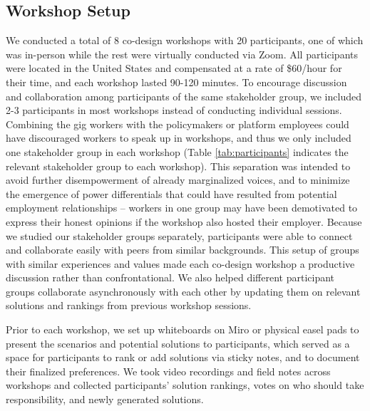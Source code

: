 \subsection{Workshop Setup}
We conducted a total of 8 co-design workshops with 20 participants, one of which was in-person while the rest were virtually conducted via Zoom. All participants were located in the United States and compensated at a rate of \$60/hour for their time, and each workshop lasted 90-120 minutes. To encourage discussion and collaboration among participants of the same stakeholder group, we included 2-3 participants in most workshops instead of conducting individual sessions. 
Combining the gig workers with the policymakers or platform employees could have discouraged workers to speak up in workshops, and thus we only included one stakeholder group in each workshop (Table \ref{tab:participants} indicates the relevant stakeholder group to each workshop). This separation was intended to avoid further disempowerment of already marginalized voices, and to minimize the emergence of power differentials that could have resulted from potential employment relationships  -- workers in one group may have been demotivated to express their honest opinions if the workshop also hosted their employer.
Because we studied our stakeholder groups separately, participants were able to connect and collaborate easily with peers from similar backgrounds. This setup of groups with similar experiences and values made each co-design workshop a productive discussion rather than confrontational. We also helped different participant groups collaborate asynchronously with each other by updating them on relevant solutions and rankings from previous workshop sessions.

Prior to each workshop, we set up whiteboards on Miro or physical easel pads to present the scenarios and potential solutions to participants, which served as a space for participants to rank or add solutions via sticky notes, and to document their finalized preferences. We took video recordings and field notes across workshops and collected participants' solution rankings, votes on who should take responsibility, and newly generated solutions.


